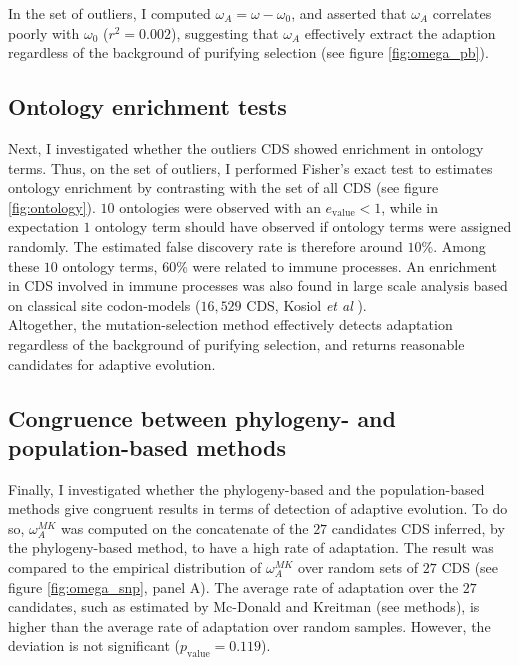 \documentclass[10pt]{article}
\begin{document}
\begin{multicols}{2}
	In the set of outliers, I computed  $\omega_A = \omega - \omega_0$, and asserted that $\omega_A$ correlates poorly with $ \omega_0$ ($r^2=0.002$), suggesting that $\omega_A$ effectively extract the adaption regardless of the background of purifying selection (see figure \ref{fig:omega_pb}). \\
	
	\subsection*{Ontology enrichment tests}
	Next, I investigated whether the outliers CDS showed enrichment in ontology terms. Thus, on the set of outliers, I performed Fisher's exact test to estimates ontology enrichment by contrasting with the set of all CDS (see figure \ref{fig:ontology}). $10$ ontologies were observed with an $e_{\mathrm{value}} <1$, while in expectation $1$ ontology term should have observed if ontology terms were assigned randomly. The estimated false discovery rate is therefore around $10 \%$. Among these $10$ ontology terms, $60 \%$ were related to immune processes. An enrichment in CDS involved in immune processes was also found in large scale analysis based on classical site codon-models ($16,529$ CDS, Kosiol \textit{et al} \cite{kosiol_patterns_2008}). \\
	
	Altogether, the mutation-selection method effectively detects adaptation regardless of the background of purifying selection, and returns reasonable candidates for adaptive evolution. 	

	\subsection*{Congruence between phylogeny- and population-based methods}
	Finally, I investigated whether the phylogeny-based and the population-based methods give congruent results in terms of detection of adaptive evolution. 
	To do so, $\omega_A^{MK}$ was computed on the concatenate of the $27$ candidates CDS inferred, by the phylogeny-based method, to have a high rate of adaptation. The result was compared to the empirical distribution of $\omega_A^{MK}$ over random sets of $27$ CDS (see figure \ref{fig:omega_snp}, panel A).
	The average rate of adaptation over the $27$ candidates, such as estimated by Mc-Donald and Kreitman (see methods), is higher than the average rate of adaptation over random samples. However, the deviation is not significant ($p_{\mathrm{value}}=0.119$).\\
	

\end{multicols}
\end{document}

